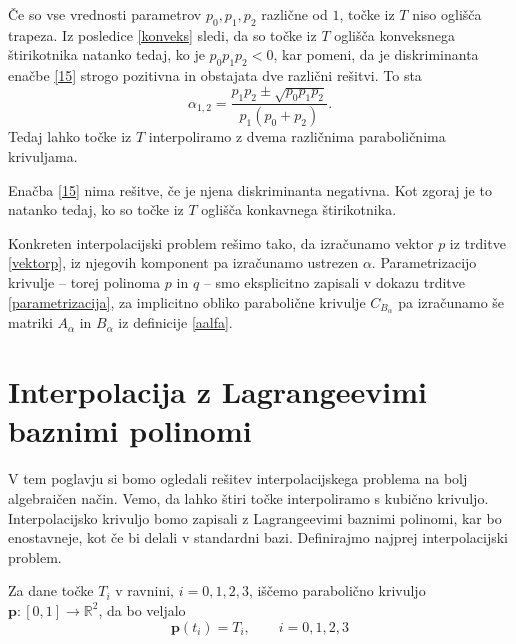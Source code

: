 \documentclass[mat1]{fmfdelo}
\newcommand{\R}{\mathbb R}
\newcommand{\al}{\alpha}
\begin{document}
\begin{dokaz}
Če so vse vrednosti parametrov $p_0, p_1, p_2$ različne od $1$, točke iz $T$ niso oglišča trapeza. Iz posledice \ref{konveks} sledi, da so točke iz $T$ oglišča konveksnega štirikotnika natanko tedaj, ko je $p_0 p_1 p_2 < 0$, kar pomeni, da je diskriminanta enačbe \eqref{15} strogo pozitivna in obstajata dve različni rešitvi. To sta
\begin{equation*}
\al_{1,2} = \frac{p_1 p_2 \pm \sqrt{p_0 p_1 p_2}}{p_1 ( p_0 + p_2)}.
\end{equation*}
 Tedaj lahko točke iz $T$ interpoliramo z dvema različnima paraboličnima krivuljama. 

Enačba \eqref{15} nima rešitve, če je njena diskriminanta negativna. Kot zgoraj je to natanko tedaj, ko so točke iz $T$ oglišča konkavnega štirikotnika.
\end{dokaz}

Konkreten interpolacijski problem rešimo tako, da izračunamo vektor $p$ iz trditve \ref{vektorp}, iz njegovih komponent pa izračunamo ustrezen $\al$. Parametrizacijo krivulje -- torej polinoma $p$ in $q$ -- smo eksplicitno zapisali v dokazu trditve \ref{parametrizacija}, za implicitno obliko parabolične krivulje $C_{B_\al}$ pa izračunamo še matriki $A_\al$ in $B_\al$ iz definicije \ref{aalfa}.



\section{Interpolacija z Lagrangeevimi baznimi polinomi}

V tem poglavju si bomo ogledali rešitev interpolacijskega problema na bolj algebraičen način. Vemo, da lahko štiri točke interpoliramo s kubično krivuljo. Interpolacijsko krivuljo bomo zapisali z Lagrangeevimi baznimi polinomi, kar bo enostavneje, kot če bi delali v standardni bazi. Definirajmo najprej interpolacijski problem.

Za dane točke $T_i$ v ravnini, $i = 0, 1, 2, 3$, iščemo parabolično krivuljo $\textbf{p} : [ 0, 1 ] \rightarrow \R^2$, da bo veljalo $$\textbf{p}(t_i) = T_i, \qquad i = 0, 1, 2, 3$$ 
\end{document}
